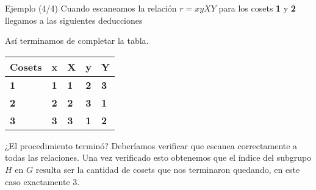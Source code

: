 \documentclass[aspectratio=169, 9pt]{beamer}
\begin{document}
\begin{frame}[fragile]{Ejemplo (4/4)}
	Cuando escaneamos la relación $r=xyXY$ para los cosets \textbf{1} y \textbf{2} 
	llegamos a las siguientes deducciones 
	\pause
	\begin{center}
	\end{center}

\pause
	Así terminamos de completar la tabla.
	
	\begin{table}[]
		\begin{tabular}{|l|l|l|l|l|}
			\hline
			Cosets     & x          & X          & y          & Y          \\ \hline
			\textbf{1} & \textbf{1} & \textbf{1} & \textbf{2} & \textbf{3} \\ \hline
			\textbf{2} & \color{verde}\textbf{2} & \color{verde}\textbf{2} & \textbf{3} & \textbf{1} \\ \hline
			\textbf{3} & \color{verde}\textbf{3} & \color{verde}\textbf{3} & \textbf{1} & \textbf{2} \\ \hline
		\end{tabular}
	\end{table}
	\pause
	¿El procedimiento terminó? 
	\pause
	Deberíamos verificar que escanea correctamente a todas las relaciones.
	\pause
	Una vez verificado esto obtenemos que el índice del subgrupo $H$ en $G$ resulta ser la cantidad de cosets que nos terminaron quedando, en este caso exactamente $3$.
\end{frame}
\end{document}
